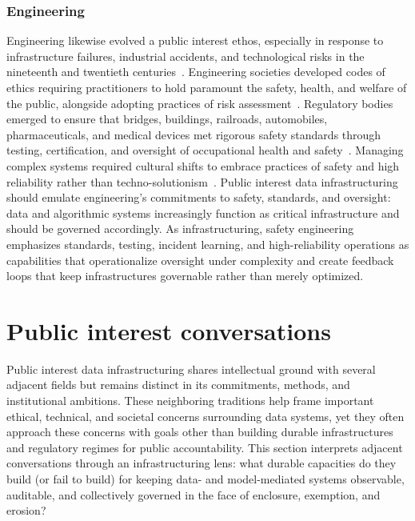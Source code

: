 \documentclass[acmsmall,screen]{acmart}
\begin{document}
\subsubsection*{Engineering}
Engineering likewise evolved a public interest ethos, especially in response to infrastructure failures, industrial accidents, and technological risks in the nineteenth and twentieth centuries~\cite{petroski1992engineer,perrow1984normal,vaughan1996challenger,dekkerDriftFailureHunting2016}. Engineering societies developed codes of ethics requiring practitioners to hold paramount the safety, health, and welfare of the public, alongside adopting practices of risk assessment~\cite{nathwaniThreePrinciplesManaging1995,boudiaIntroductionRiskRisk2007}. Regulatory bodies emerged to ensure that bridges, buildings, railroads, automobiles, pharmaceuticals, and medical devices met rigorous safety standards through testing, certification, and oversight of occupational health and safety~\cite{abramsShortHistoryOccupational2001}. Managing complex systems required cultural shifts to embrace practices of safety and high reliability rather than techno-solutionism~\cite{weickOrganizingHighReliability1999,haleWorkingRuleWorkingI2013,haleWorkingRuleWorkingII2013}. Public interest data infrastructuring should emulate engineering's commitments to safety, standards, and oversight: data and algorithmic systems increasingly function as critical infrastructure and should be governed accordingly. As infrastructuring, safety engineering emphasizes standards, testing, incident learning, and high-reliability operations as capabilities that operationalize oversight under complexity and create feedback loops that keep infrastructures governable rather than merely optimized.

\section*{Public interest conversations}
Public interest data infrastructuring shares intellectual ground with several adjacent fields but remains distinct in its commitments, methods, and institutional ambitions. These neighboring traditions help frame important ethical, technical, and societal concerns surrounding data systems, yet they often approach these concerns with goals other than building durable infrastructures and regulatory regimes for public accountability. This section interprets adjacent conversations through an infrastructuring lens: what durable capacities do they build (or fail to build) for keeping data- and model-mediated systems observable, auditable, and collectively governed in the face of enclosure, exemption, and erosion?
\end{document}
